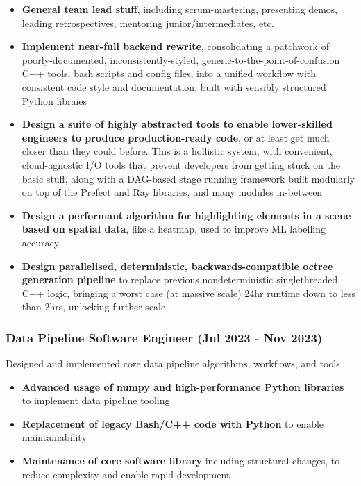 \documentclass[12pt]{article}
\begin{document}
\begin{FlushLeft}
  \begin{itemize}
  \item \textbf{General team lead stuff}, including scrum-mastering, presenting demos, leading retrospectives, mentoring junior/intermediates, etc. \\
  \item \textbf{Implement near-full backend rewrite}, consolidating a patchwork of poorly-documented, inconsistently-styled, generic-to-the-point-of-confusion C++ tools, bash scripts and config files, into a unified workflow with consistent code style and documentation, built with sensibly structured Python libraies \\
  \item \textbf{Design a suite of highly abstracted tools to enable lower-skilled engineers to produce production-ready code}, or at least get much closer than they could before. This is a hollistic system, with convenient, cloud-agnostic I/O tools that prevent developers from getting stuck on the basic stuff, along with a DAG-based stage running framework built modularly on top of the Prefect and Ray libraries, and many modules in-between \\
  \item \textbf{Design a performant algorithm for highlighting elements in a scene based on spatial data}, like a heatmap, used to improve ML labelling accuracy \\
  \item \textbf{Design parallelised, deterministic, backwards-compatible octree generation pipeline} to replace previous nondeterministic singlethreaded C++ logic, bringing a worst case (at massive scale) 24hr runtime down to less than 2hrs, unlocking further scale \\
  \end{itemize}

  \subsubsection{Data Pipeline Software Engineer (Jul 2023 - Nov 2023)}
  Designed and implemented core data pipeline algorithms, workflows, and tools \\

  \begin{itemize}
  \item \textbf{Advanced usage of numpy and high-performance Python libraries} to implement data pipeline tooling \\
  \item \textbf{Replacement of legacy Bash/C++ code with Python} to enable maintainability \\
  \item \textbf{Maintenance of core software library} including structural changes, to reduce complexity and enable rapid development \\
  \end{itemize}


\end{FlushLeft}
\end{document}

